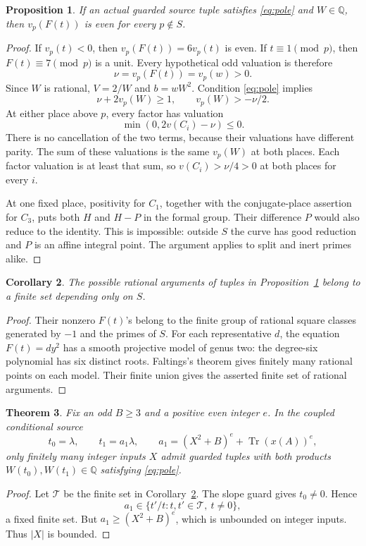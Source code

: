 \documentclass[11pt,a4paper]{article}
\newtheorem{theorem}{Theorem}[section]
\newtheorem{proposition}[theorem]{Proposition}
\newtheorem{corollary}[theorem]{Corollary}
\newcommand{\Q}{\mathbb Q}\newcommand{\Z}{\mathbb Z}
\DeclareMathOperator{\Tr}{Tr}
\begin{document}
\begin{proposition}\label{prop:local}
If an actual guarded source tuple satisfies \eqref{eq:pole} and
\(W\in\Q\), then \(v_p(F(t))\) is even for every \(p\notin S\).
\end{proposition}
\begin{proof}
If \(v_p(t)<0\), then \(v_p(F(t))=6v_p(t)\) is even.
If \(t\equiv1\pmod p\), then \(F(t)\equiv7\pmod p\) is a unit.
Every hypothetical odd valuation is therefore
\[
 \nu=v_p(F(t))=v_p(w)>0.
\]
Since \(W\) is rational, \(V=2/W\) and \(b=wW^2\).
Condition \eqref{eq:pole} implies
\[
 \nu+2v_p(W)\ge1,\qquad v_p(W)>-\nu/2.
\]
At either place above \(p\), every factor has valuation
\[
 \min(0,2v(C_i)-\nu)\le0.
\]
There is no cancellation of the two terms, because their valuations
have different parity. The sum of these valuations is the same
\(v_p(W)\) at both places. Each factor valuation is at least that
sum, so \(v(C_i)>\nu/4>0\) at both places for every \(i\).

At one fixed place, positivity for \(C_1\), together with the
conjugate-place assertion for \(C_3\), puts both \(H\) and
\(H-P\) in the formal group. Their difference \(P\) would also
reduce to the identity. This is impossible: outside \(S\) the
curve has good reduction and \(P\) is an affine integral point.
The argument applies to split and inert primes alike.
\end{proof}

\begin{corollary}\label{cor:finite}
The possible rational arguments of tuples in Proposition~\ref{prop:local}
belong to a finite set depending only on \(S\).
\end{corollary}
\begin{proof}
Their nonzero \(F(t)\)'s belong to the finite group of rational
square classes generated by \(-1\) and the primes of \(S\).
For each representative \(d\), the equation \(F(t)=d y^2\)
has a smooth projective model of genus two: the degree-six polynomial
has six distinct roots. Faltings's theorem \cite{Faltings} gives
finitely many rational points on each model. Their finite union
gives the asserted finite set of rational arguments.
\end{proof}

\begin{theorem}\label{thm:two}
Fix an odd \(B\ge3\) and a positive even integer \(e\).
In the coupled conditional source
\[
 t_0=\lambda,\qquad t_1=a_1\lambda,\qquad
 a_1=(X^2+B)^e+\Tr(x(A))^e,
\]
only finitely many integer inputs \(X\) admit guarded tuples with
both products \(W(t_0),W(t_1)\in\Q\) satisfying \eqref{eq:pole}.
\end{theorem}
\begin{proof}
Let \(\mathcal T\) be the finite set in Corollary~\ref{cor:finite}.
The slope guard gives \(t_0\ne0\). Hence
\[
 a_1\in\{t'/t:t,t'\in\mathcal T,\ t\ne0\},
\]
a fixed finite set. But \(a_1\ge(X^2+B)^e\), which is unbounded
on integer inputs. Thus \(|X|\) is bounded.
\end{proof}
\end{document}
